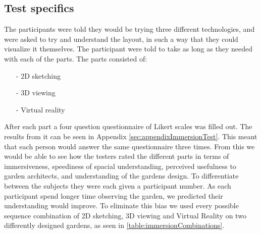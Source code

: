 \subsection{Test specifics}
The participants were told they would be trying three different technologies, and were asked to try and understand the layout, in such a way that they could visualize it themselves. The participant were told to take as long as they needed with each of the parts. The parts consisted of:
\begin{itemize}
	\item[-] 2D sketching
	\item[-] 3D viewing
	\item[-] Virtual reality
\end{itemize}
After each part a four question questionnaire of Likert scales was filled out. The results from it can be seen in Appendix \ref{sec:appendixImmersionTest}. This meant that each person would answer the same questionnaire three times. From this we would be able to see how the testers rated the different parts in terms of immersiveness, speediness of spacial understanding, perceived usefulness to garden architects, and understanding of the gardens design. To differentiate between the subjects they were each given a participant number. As each participant spend longer time observing the garden, we predicted their understanding would improve. To eliminate this bias we used every possible sequence combination of 2D sketching, 3D viewing and Virtual Reality on two differently designed gardens, as seen in \autoref{table:immersionCombinations}.


